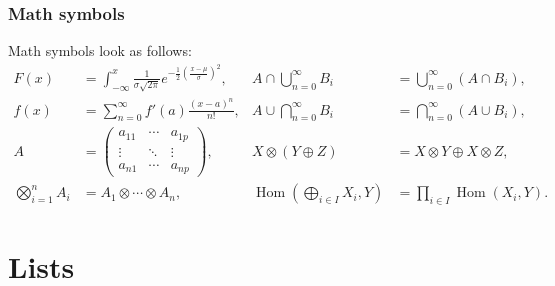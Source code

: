 \documentclass{beamer}
\begin{document}
\begin{frame}
    \frametitle{Math symbols}

    Math symbols look as follows:
    \begin{align*}
        F(x)                                                   & =\int_{-\infty}^x\frac{1}{\sigma\sqrt{2\pi}}e^{-\frac{1}{2}\left(\frac{x-\mu}{\sigma}\right)^2}, &
        A\cap\bigcup_{n=0}^\infty B_i                          & =\bigcup_{n=0}^\infty (A\cap B_i),                                                                 \\
        f(x)                                                   & =\sum_{n=0}^\infty f'(a)\frac{(x-a)^n}{n!},                                                      &
        A\cup\bigcap_{n=0}^\infty B_i                          & =\bigcap_{n=0}^\infty (A\cup B_i),                                                                 \\
        A                                                      & = \begin{pmatrix}
                                                                       a_{11} & \cdots & a_{1p} \\
                                                                       \vdots & \ddots & \vdots \\
                                                                       a_{n1} & \cdots & a_{np}
                                                                   \end{pmatrix},                                                                      &
        X\otimes(Y\oplus Z)                                    & =X\otimes Y\oplus X\otimes Z,                                                                      \\
        \bigotimes_{i=1}^nA_i                                  & =A_1\otimes\cdots\otimes A_n,                                                                    &
        \operatorname{Hom}\left(\bigoplus_{i\in I}X_i,Y\right) &
        =\prod_{i\in I}\operatorname{Hom}(X_i,Y).
    \end{align*}

\end{frame}

\section{Lists}
\end{document}
